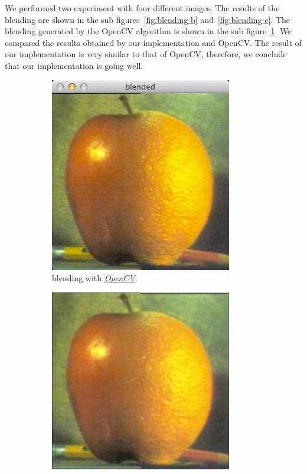 We performed two experiment with four different images. The results of the blending are shown in the sub figures~\ref{fig:blending-b} and~\ref{fig:blending-c}. The blending generated by the OpenCV algorithm is shown in the sub figure~\ref{fig:blending-a}. We compared the results obtained by our implementation and OpenCV. The result of our implementation is very similar to that of OpenCV, therefore, we conclude that our implementation is going well.
\begin{figure}[h!]
\centering
\begin{subfigure}{0.33\textwidth}
  \centering
  \includegraphics[width=0.8\linewidth]{output/blendedOpenCV.jpg}
  \caption{blending with \href{http://docs.opencv.org/3.1.0/dc/dff/tutorial_py_pyramids.html}{\textit{OpenCV}}.}
  \label{fig:blending-a}
\end{subfigure}%
\begin{subfigure}{0.33\textwidth}
  \centering
  \includegraphics[width=0.8\linewidth]{output/blending1.jpg}

\end{subfigure}
\end{figure}
